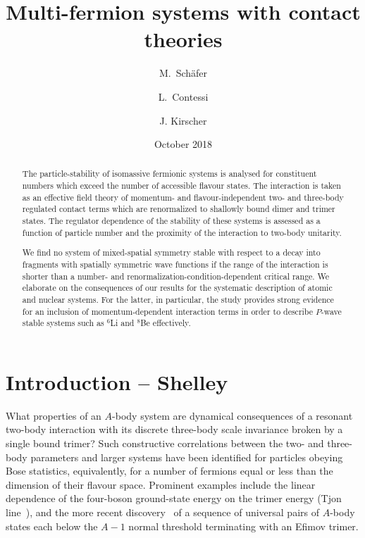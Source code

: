 \documentclass[preprint,12pt]{elsarticle}
\begin{document}
\title{Multi-fermion systems with contact theories}
\author{M.~Sch{\"a}fer}\address{Czech Technical University in Prague, Faculty of Nuclear Sciences 
and Physical Engineering, B\v{r}ehov\'{a} 7, 11519 Prague 1, Czech Republic} 
\author{L.~Contessi} 
\address{Racah Institute of Physics, The Hebrew university, 91904 Jerusalem, 
Israel} 
\address{ESNT, IRFU, CEA, Universite Paris Saclay, F-91191 Gif-sur-Yvette, France} 
\author{J. Kirscher}
\address{Theoretical Physics Division, School of Physics and Astronomy,
The University of Manchester, Manchester, M13 9PL, United Kingdom} 
\date{October 2018}


\begin{abstract}
The particle-stability of isomassive fermionic systems is analysed
for constituent numbers which exceed the number of accessible flavour states. The interaction is taken as an 
effective field theory of momentum- and flavour-independent two- and three-body
regulated contact terms which are renormalized to shallowly bound dimer and trimer states.
The regulator dependence of the stability of these systems is assessed as a function of
particle number and the proximity of the interaction to two-body unitarity.

We find no system of mixed-spatial symmetry stable with respect to
a decay into fragments with spatially symmetric wave functions if the range of the
interaction is shorter than a number- and renormalization-condition-dependent
critical range.
We elaborate on the consequences of our results for the systematic description of
atomic and nuclear systems. For the latter, in particular, the study provides
strong evidence for an inclusion of momentum-dependent interaction terms in order
to describe $P$-wave stable systems such as $^6$Li and $^8$Be effectively.
\end{abstract}

\maketitle

\section{Introduction -- Shelley}

What properties of an $A$-body system are dynamical consequences of a resonant two-body interaction
with its discrete three-body scale invariance broken by a single bound trimer?
Such constructive correlations between the two- and three-body parameters and larger systems have been
identified for particles obeying Bose statistics, equivalently, for a number of fermions equal or less
than the dimension of their flavour space. Prominent examples include
the linear dependence of the four-boson ground-state energy on the trimer energy (Tjon line~\cite{tjon}), and
the more recent discovery~\cite{von_Stecher_2010} of a sequence of universal pairs of $A$-body states
each below the $A-1$ normal threshold terminating with an Efimov trimer.
\end{document}
